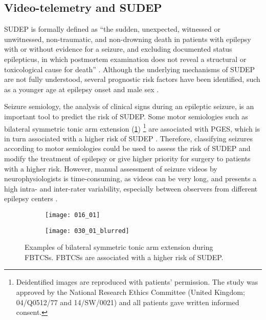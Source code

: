 \subsection{Video-telemetry and SUDEP}

\acs{SUDEP} is formally defined as ``the sudden, unexpected, witnessed or unwitnessed, non-traumatic, and non-drowning death in patients with epilepsy with or without evidence for a seizure, and excluding documented status epilepticus, in which postmortem examination does not reveal a structural or toxicological cause for death'' \cite{nashef_sudden_1997}.
Although the underlying mechanisms of \ac{SUDEP} are not fully understood, several prognostic risk factors have been identified, such as a younger age at epilepsy onset and male sex \cite{so_what_2008,jha_sudden_2021}.

Seizure semiology, the analysis of clinical signs during an epileptic seizure, is an important tool to predict the risk of \ac{SUDEP}.
Some motor semiologies such as bilateral symmetric tonic arm extension (\cref{fig:decerebration})%
\footnote{Deidentified images are reproduced with patients' permission. The study was approved by the National Research Ethics Committee (United Kingdom; 04/Q0512/77 and 14/SW/0021) and all patients gave written informed consent.} %
are associated with \ac{PGES}, which is in turn associated with a higher risk of \ac{SUDEP} \cite{alexandre_risk_2015,vilella_association_2021}.
Therefore, classifying seizures according to motor semiologies could be used to assess the risk of \ac{SUDEP} and modify the treatment of epilepsy or give higher priority for surgery to patients with a higher risk.
However, manual assessment of seizure videos by neurophysiologists is time-consuming, as videos can be very long, and presents a high intra- and inter-rater variability, especially between observers from different epilepsy centers \cite{tufenkjian_seizure_2012}.

\begin{figure}
  \centering

  \begin{subfigure}{0.49\linewidth}
    \texttt{[image: 016\_01]}
  \end{subfigure}
  \begin{subfigure}{0.49\linewidth}
    \texttt{[image: 030\_01\_blurred]}
  \end{subfigure}
  \caption[Examples of bilateral symmetric tonic arm extension]{
    Examples of bilateral symmetric tonic arm extension during \acfp*{FBTCS}.
    \Acp*{FBTCS} are associated with a higher risk of \acf*{SUDEP}.
  }
  \label{fig:decerebration}
\end{figure}

